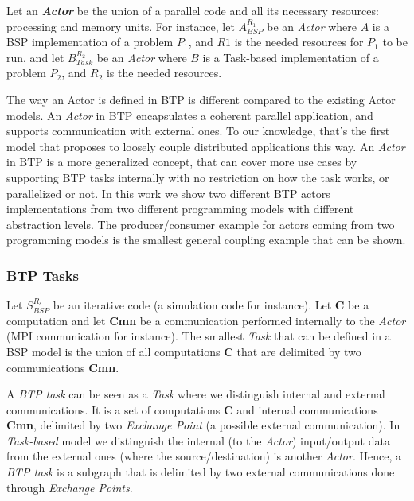 Let an \textbf{\textit{Actor}} be the union of a parallel code and all its necessary resources: processing and memory units.   
For instance, let $A_{BSP}^{R_{1}}$ be an \textit{Actor} where $A$ is a BSP implementation of a problem $P_{1}$, and $R1$ is the needed resources for $P_{1}$ to be run, and let $B_{Task}^{R_{2}}$ be an \textit{Actor} where $B$ is a Task-based implementation of a problem $P_{2}$, and $R_{2}$ is the needed resources.

The way an Actor is defined in BTP is different compared to the existing Actor models. An \textit{Actor} in BTP encapsulates a coherent parallel application, and supports communication with external ones. To our knowledge, that's the first model that proposes to loosely couple distributed applications this way. An \textit{Actor} in BTP is a more generalized concept, that can cover more use cases by supporting BTP tasks internally with no restriction on how the task works, or parallelized or not. In this work we show two different BTP actors implementations from two different programming models with different abstraction levels. The producer/consumer example for actors coming from two programming models is the smallest general coupling example that can be shown.

\subsubsection{BTP Tasks}\label{btptask}
Let $S_{BSP}^{R_{s}}$ be an iterative code (a simulation code for instance). Let \textbf{C} be a computation and let \textbf{Cmn} be a communication performed internally to the \textit{Actor} (MPI communication for instance). The smallest \textit{Task} that can be defined in a BSP model is the union of all computations \textbf{C} that are delimited by two communications \textbf{Cmn}. 

A \textit{BTP task} can be seen as a \textit{Task} where we distinguish internal and external communications. It is a set of computations \textbf{C} and internal communications \textbf{Cmn}, delimited by two \textit{Exchange Point} (a possible external communication). In \textit{Task-based} model we distinguish the internal (to the \textit{Actor}) input/output data from the external ones (where the source/destination) is another \textit{Actor}. Hence, a \textit{BTP task} is a subgraph that is delimited by two external communications done through \textit{Exchange Points}.


